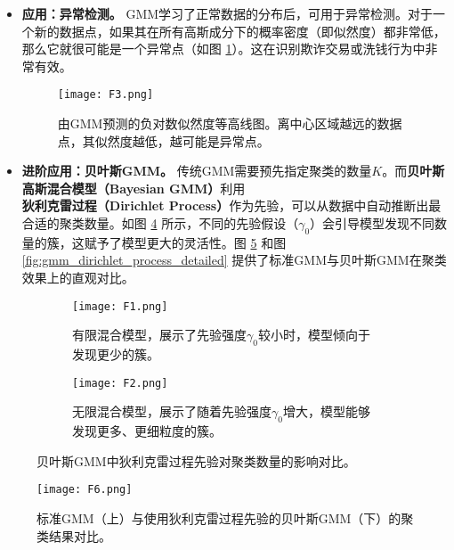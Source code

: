\begin{itemize}
\begin{itemize}
        \item \textbf{应用：异常检测。} GMM学习了正常数据的分布后，可用于异常检测。对于一个新的数据点，如果其在所有高斯成分下的概率密度（即似然度）都非常低，那么它就很可能是一个异常点（如图 \ref{fig:gmm_log_likelihood}）。这在识别欺诈交易或洗钱行为中非常有效。

        \begin{figure}[htbp]
            \centering
            \texttt{[image: F3.png]}
            \caption{由GMM预测的负对数似然度等高线图。离中心区域越远的数据点，其似然度越低，越可能是异常点。}
            \label{fig:gmm_log_likelihood}
        \end{figure}

        \item \textbf{进阶应用：贝叶斯GMM。} 传统GMM需要预先指定聚类的数量$K$。而\textbf{贝叶斯高斯混合模型（Bayesian GMM）}利用\textbf{狄利克雷过程（Dirichlet Process）}作为先验，可以从数据中自动推断出最合适的聚类数量。如图 \ref{fig:bayesian_gmm_comparison} 所示，不同的先验假设（$\gamma_0$）会引导模型发现不同数量的簇，这赋予了模型更大的灵活性。图 \ref{fig:gmm_vs_bayesian_gmm} 和图 \ref{fig:gmm_dirichlet_process_detailed} 提供了标准GMM与贝叶斯GMM在聚类效果上的直观对比。

    \end{itemize}

    \begin{figure}[htbp]
        \centering
        \begin{subfigure}[b]{\textwidth}
            \centering
            \texttt{[image: F1.png]}
            \caption{有限混合模型，展示了先验强度$\gamma_0$较小时，模型倾向于发现更少的簇。}
            \label{fig:finite_mixture_dirichlet}
        \end{subfigure}
        \vfill
        \begin{subfigure}[b]{\textwidth}
            \centering
            \texttt{[image: F2.png]}
            \caption{无限混合模型，展示了随着先验强度$\gamma_0$增大，模型能够发现更多、更细粒度的簇。}
            \label{fig:infinite_mixture_dirichlet}
        \end{subfigure}
        \caption{贝叶斯GMM中狄利克雷过程先验对聚类数量的影响对比。}
        \label{fig:bayesian_gmm_comparison}
    \end{figure}

    \begin{figure}[htbp]
        \centering
        \texttt{[image: F6.png]}
        \caption{标准GMM（上）与使用狄利克雷过程先验的贝叶斯GMM（下）的聚类结果对比。}
        \label{fig:gmm_vs_bayesian_gmm}
    \end{figure}
    

\end{itemize}
